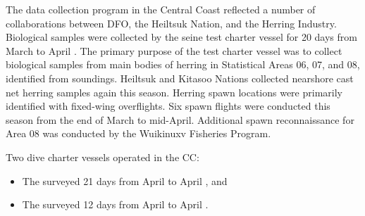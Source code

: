 The data collection program in the Central Coast reflected
a number of collaborations between
DFO, the Heiltsuk Nation, and the Herring Industry.
Biological samples were collected by the seine test charter vessel
 for 20 days from March  to April .
The primary purpose of the test charter vessel was to
collect biological samples from main bodies of herring
in Statistical Areas 06, 07, and 08, identified from soundings.
Heiltsuk and Kitasoo Nations collected nearshore
cast net herring samples again this season.
Herring spawn locations were primarily identified with fixed-wing overflights.
Six spawn flights were conducted this season from
the end of March to mid-April.
Additional spawn reconnaissance for Area 08 was conducted
by the Wuikinuxv Fisheries Program.

Two dive charter vessels operated in the CC:

\begin{itemize}

\item The  surveyed 21 days
from April  to April , and

\item The  surveyed 12 days
from April  to April .

\end{itemize}
